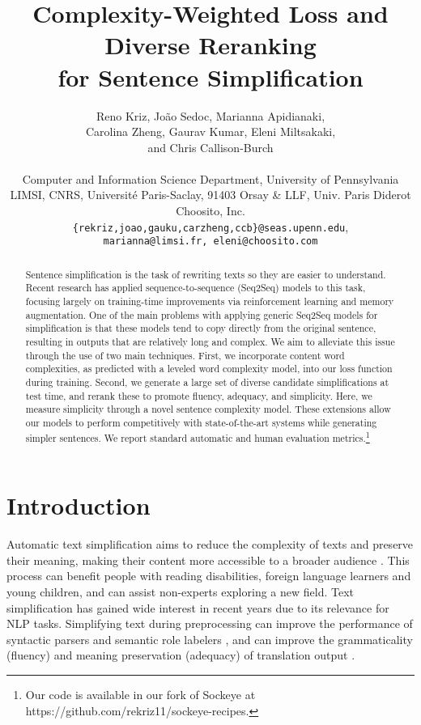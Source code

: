 \documentclass[11pt,a4paper]{article}
\title{Complexity-Weighted Loss and Diverse Reranking \\ for Sentence Simplification}
\author{\parbox{12cm}{\centering Reno Kriz, Jo\~ao Sedoc, Marianna Apidianaki, \\ Carolina Zheng, Gaurav Kumar, Eleni Miltsakaki, \\ and Chris Callison-Burch} \\
 Computer and Information Science Department, University of Pennsylvania \\
 LIMSI, CNRS, Universit\'e Paris-Saclay, 91403 Orsay \& LLF, Univ. Paris Diderot \\
 Choosito, Inc. \\ 
{\tt \{rekriz,joao,gauku,carzheng,ccb\}@seas.upenn.edu}, \\ {\tt marianna@limsi.fr, eleni@choosito.com}
}
\date{}
\begin{document}
\maketitle

\begin{abstract}
    Sentence simplification is the task of rewriting texts so they are easier to understand. Recent research has applied sequence-to-sequence (Seq2Seq) models to this task, focusing largely on training-time improvements via reinforcement learning and memory augmentation. One of the main problems with applying generic Seq2Seq models for simplification is that these models tend to copy directly from the original sentence, resulting in outputs that are relatively long and complex. We aim to alleviate this issue through the use of two main techniques. 
    First, we incorporate content word complexities, as predicted with a leveled word complexity model, into our loss function during training.
    Second, we generate a large set of diverse candidate simplifications at test time, and rerank these to promote fluency, adequacy, and simplicity. Here, we measure simplicity through a novel sentence complexity model. 
    These extensions allow our models to perform competitively with state-of-the-art systems while generating simpler sentences.
    We report standard automatic and human evaluation metrics.\footnote{Our code is available in our fork of Sockeye \cite{hieber2017sockeye} at https://github.com/rekriz11/sockeye-recipes.} 
\end{abstract}

\section{Introduction}

Automatic text simplification aims to reduce the complexity of texts and preserve their meaning, making their content more accessible to a broader audience \cite{saggion2017automatic}.
This process can benefit people with reading disabilities, foreign language learners and young children, and can assist non-experts exploring a new field. Text simplification has gained wide interest in recent years due to its relevance for NLP tasks. Simplifying text during preprocessing can improve the performance of syntactic parsers \cite{chandrasekar1996motivations} and semantic role labelers \cite{vickrey2008sentence,woodsend2014text}, and can improve the grammaticality (fluency) and meaning preservation (adequacy) of  translation output \cite{stajner2016text}.
\end{document}
